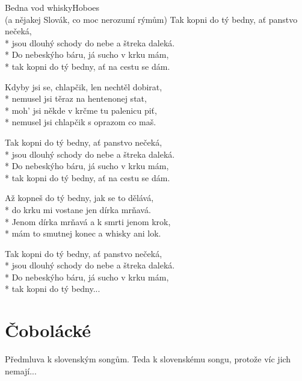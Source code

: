 \documentclass[10.5pt]{book}
\begin{document}
\begin{poem}{Bedna vod whisky}{Hoboes\\(a nějakej Slovák, co moc nerozumí rýmům)}
Tak kopni do tý bedny, ať panstvo nečeká,\\*
jsou dlouhý schody do nebe a štreka daleká.\\*
Do nebeskýho báru, já sucho v krku mám,\\*
tak kopni do tý bedny, ať na cestu se dám.

Kdyby jsi se, chlapčik, len nechtěl dobirat,\\*
nemusel jsi těraz na hentenonej stat,\\*
moh' jsi někde v krčme tu palenicu piť,\\*
nemusel jsi chlapčik s oprazom co maš.

Tak kopni do tý bedny, ať panstvo nečeká,\\*
jsou dlouhý schody do nebe a štreka daleká.\\*
Do nebeskýho báru, já sucho v krku mám,\\*
tak kopni do tý bedny, ať na cestu se dám.

Až kopneš do tý bedny, jak se to dělává,\\*
do krku mi vostane jen dírka mrňavá.\\*
Jenom dírka mrňavá a k smrti jenom krok,\\*
mám to smutnej konec a whisky ani lok.

Tak kopni do tý bedny, ať panstvo nečeká,\\*
jsou dlouhý schody do nebe a štreka daleká.\\*
Do nebeskýho báru, já sucho v krku mám,\\*
tak kopni do tý bedny...

\end{poem}


\section{Čobolácké}
Předmluva k slovenským songům. Teda k slovenskému songu, protože víc jich
nemají... 

\newpage
\thispagestyle{empty}
\end{document}
